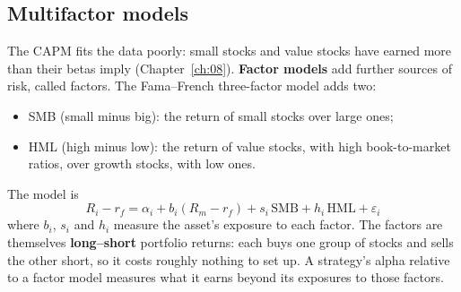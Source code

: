 
\subsection{Multifactor models}
\label{sec:03-factors}

The CAPM fits the data poorly: small stocks and value stocks have earned more than their betas imply (Chapter~\ref{ch:08}). \textbf{Factor models} add further sources of risk, called factors. The Fama--French three-factor model adds two:

\begin{itemize}
  \item SMB (small minus big): the return of small stocks over large ones;
  \item HML (high minus low): the return of value stocks, with high book-to-market ratios, over growth stocks, with low ones.
\end{itemize}

The model is
\begin{equation}
  R_i - r_f = \alpha_i + b_i(R_m - r_f) + s_i\,\mathrm{SMB} + h_i\,\mathrm{HML} + \varepsilon_i
  \label{eq:03-ff3}
\end{equation}
where $b_i$, $s_i$ and $h_i$ measure the asset's exposure to each factor. The factors are themselves \textbf{long--short} portfolio returns: each buys one group of stocks and sells the other short, so it costs roughly nothing to set up. A strategy's alpha relative to a factor model measures what it earns beyond its exposures to those factors.

